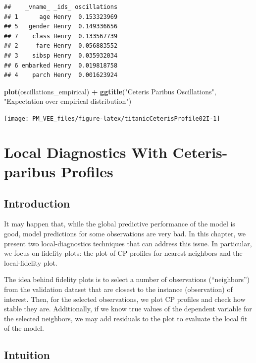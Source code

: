 \documentclass[12pt,]{krantz}
\newenvironment{Shaded}{\begin{snugshade}}{\end{snugshade}}
\newcommand{\KeywordTok}[1]{\textcolor[rgb]{0.13,0.29,0.53}{\textbf{#1}}}
\newcommand{\NormalTok}[1]{#1}
\newcommand{\OperatorTok}[1]{\textcolor[rgb]{0.81,0.36,0.00}{\textbf{#1}}}
\newcommand{\StringTok}[1]{\textcolor[rgb]{0.31,0.60,0.02}{#1}}
\theoremstyle{definition}
\theoremstyle{definition}
\theoremstyle{definition}
\theoremstyle{remark}
\begin{document}
\begin{verbatim}
##    _vname_ _ids_ oscillations
## 1      age Henry  0.153323969
## 5   gender Henry  0.149336656
## 7    class Henry  0.133567739
## 2     fare Henry  0.056883552
## 3    sibsp Henry  0.035932034
## 6 embarked Henry  0.019818758
## 4    parch Henry  0.001623924
\end{verbatim}

\begin{Shaded}
\begin{Highlighting}[]
\KeywordTok{plot}\NormalTok{(oscillations_empirical) }\OperatorTok{+}\StringTok{ }\KeywordTok{ggtitle}\NormalTok{(}\StringTok{"Ceteris Paribus Oscillations"}\NormalTok{, }\StringTok{"Expectation over empirical distribution"}\NormalTok{)}
\end{Highlighting}
\end{Shaded}

\begin{center}\texttt{[image: PM\_VEE\_files/figure-latex/titanicCeterisProfile02I-1]} \end{center}

\hypertarget{localDiagnostics}{%
\section{Local Diagnostics With Ceteris-paribus
Profiles}\label{localDiagnostics}}

\hypertarget{cPLocDiagIntro}{%
\subsection{Introduction}\label{cPLocDiagIntro}}

It may happen that, while the global predictive performance of the model
is good, model predictions for some observations are very bad. In this
chapter, we present two local-diagnostics techniques that can address
this issue. In particular, we focus on fidelity plots: the plot of CP
profiles for nearest neighbors and the local-fidelity plot.

The idea behind fidelity plots is to select a number of observations
(``neighbors'') from the validation dataset that are closest to the
instance (observation) of interest. Then, for the selected observations,
we plot CP profiles and check how stable they are. Additionally, if we
know true values of the dependent variable for the selected neighbors,
we may add residuals to the plot to evaluate the local fit of the model.

\hypertarget{cPLocDiagIntuition}{%
\subsection{Intuition}\label{cPLocDiagIntuition}}
\end{document}

